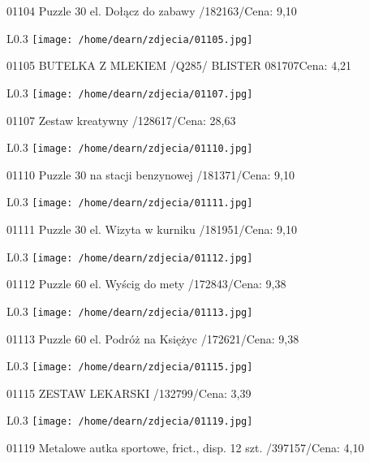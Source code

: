 01104 Puzzle 30 el. Dołącz do zabawy /182163/Cena: 9,10\newline
\begin{wrapfigure}{L}{0.3\textwidth}
\texttt{[image: /home/dearn/zdjecia/01105.jpg]}
\end{wrapfigure}
01105 BUTELKA Z MLEKIEM /Q285/  BLISTER               081707Cena: 4,21\newline
\begin{wrapfigure}{L}{0.3\textwidth}
\texttt{[image: /home/dearn/zdjecia/01107.jpg]}
\end{wrapfigure}
01107 Zestaw kreatywny /128617/Cena: 28,63\newline
\begin{wrapfigure}{L}{0.3\textwidth}
\texttt{[image: /home/dearn/zdjecia/01110.jpg]}
\end{wrapfigure}
01110 Puzzle 30 na stacji benzynowej /181371/Cena: 9,10\newline
\begin{wrapfigure}{L}{0.3\textwidth}
\texttt{[image: /home/dearn/zdjecia/01111.jpg]}
\end{wrapfigure}
01111 Puzzle 30 el. Wizyta w kurniku /181951/Cena: 9,10\newline
\begin{wrapfigure}{L}{0.3\textwidth}
\texttt{[image: /home/dearn/zdjecia/01112.jpg]}
\end{wrapfigure}
01112 Puzzle 60 el. Wyścig do mety /172843/Cena: 9,38\newline
\begin{wrapfigure}{L}{0.3\textwidth}
\texttt{[image: /home/dearn/zdjecia/01113.jpg]}
\end{wrapfigure}
01113 Puzzle 60 el. Podróż na Księżyc /172621/Cena: 9,38\newline
\begin{wrapfigure}{L}{0.3\textwidth}
\texttt{[image: /home/dearn/zdjecia/01115.jpg]}
\end{wrapfigure}
01115 ZESTAW LEKARSKI /132799/Cena: 3,39\newline
\begin{wrapfigure}{L}{0.3\textwidth}
\texttt{[image: /home/dearn/zdjecia/01119.jpg]}
\end{wrapfigure}
01119 Metalowe autka sportowe, frict., disp. 12 szt. /397157/Cena: 4,10\newline
